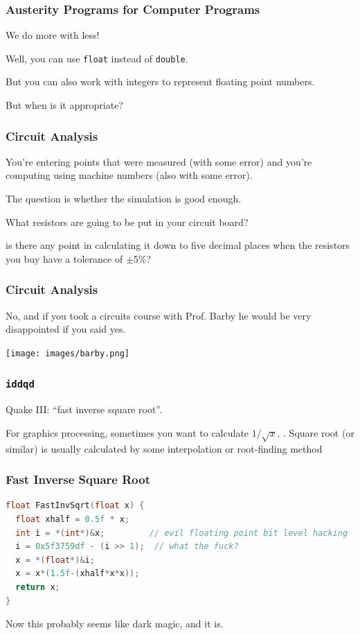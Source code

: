 \begin{frame}
\frametitle{Austerity Programs for Computer Programs}

We do more with less! 

Well, you can use \texttt{float} instead of \texttt{double}. 

But you can also work with integers to represent floating point numbers.

But when is it appropriate?


\end{frame}


\begin{frame}
\frametitle{Circuit Analysis}

You're entering points that were measured (with some error) and you're computing using machine numbers (also with some error).

The question is whether the simulation is good enough.

What resistors are going to be put in your circuit board?

is there any point in calculating it down to five decimal places when the resistors you buy have a tolerance of $\pm$5\%? 

\end{frame}


\begin{frame}
\frametitle{Circuit Analysis}


No, and if you took a circuits course with Prof. Barby he would be very disappointed if you said yes.

\begin{center}
	\texttt{[image: images/barby.png]}
\end{center}

\end{frame}


\begin{frame}
\frametitle{\texttt{iddqd}}

Quake III: ``fast inverse square root''. 

For graphics processing, sometimes you want to calculate $1/\sqrt{x}$.
.
Square root (or similar) is usually calculated by some interpolation or root-finding method

\end{frame}


\begin{frame}[fragile]
\frametitle{Fast Inverse Square Root}

\begin{lstlisting}[language=C]
float FastInvSqrt(float x) {
  float xhalf = 0.5f * x;
  int i = *(int*)&x;         // evil floating point bit level hacking
  i = 0x5f3759df - (i >> 1);  // what the fuck?
  x = *(float*)&i;
  x = x*(1.5f-(xhalf*x*x));
  return x;
}
\end{lstlisting}

 Now this probably seems like dark magic, and it is. 

\end{frame}


